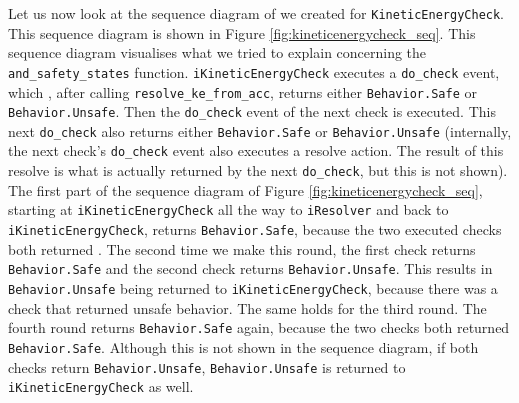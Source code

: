 \documentclass[12pt]{scrreprt}
\begin{document}
Let us now look at the sequence diagram of we created for \texttt{KineticEnergyCheck}. This sequence diagram is shown in Figure \ref{fig:kineticenergycheck_seq}. This sequence diagram visualises what we tried to explain concerning the \texttt{and\_safety\_states} function. \texttt{iKineticEnergyCheck} executes a \texttt{do\_check} event, which , after calling \texttt{resolve\_ke\_from\_acc}, returns either \texttt{Behavior.Safe} or \texttt{Behavior.Unsafe}. Then the \texttt{do\_check} event of the next check is executed. This next \texttt{do\_check} also returns either \texttt{Behavior.Safe} or \texttt{Behavior.Unsafe} (internally, the next check's \texttt{do\_check} event also executes a resolve action. The result of this resolve is what is actually returned by the next \texttt{do\_check}, but this is not shown). The first part of the sequence diagram of Figure \ref{fig:kineticenergycheck_seq}, starting at \texttt{iKineticEnergyCheck} all the way to \texttt{iResolver} and back to \texttt{iKineticEnergyCheck}, returns \texttt{Behavior.Safe}, because the two executed checks both returned . The second time we make this round, the first check returns \texttt{Behavior.Safe} and the second check returns \texttt{Behavior.Unsafe}. This results in \texttt{Behavior.Unsafe} being returned to \texttt{iKineticEnergyCheck}, because there was a check that returned unsafe behavior. The same holds for the third round. The fourth round returns \texttt{Behavior.Safe} again, because the two checks both returned \texttt{Behavior.Safe}. Although this is not shown in the sequence diagram, if both checks return \texttt{Behavior.Unsafe}, \texttt{Behavior.Unsafe} is returned to \texttt{iKineticEnergyCheck} as well.
\end{document}
